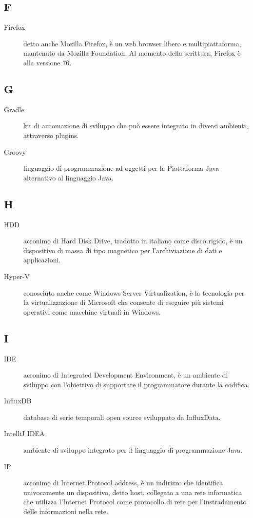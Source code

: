 \documentclass[../manuale-manutentore.tex]{subfiles}
\begin{document}
\subsection{F}

\begin{description}
  \item[Firefox] detto anche Mozilla Firefox, è un web browser libero e multipiattaforma, mantenuto da Mozilla Foundation. Al momento della scrittura, Firefox è alla versione 76.
\end{description}

\subsection{G}

\begin{description}
    \item[Gradle] kit di automazione di sviluppo che può essere integrato in diversi ambienti, attraverso plugins.
    \item[Groovy] linguaggio di programmazione ad oggetti per la Piattaforma Java alternativo al linguaggio Java.
\end{description}

\subsection{H}

\begin{description}
  \item[HDD] acronimo di Hard Disk Drive, tradotto in italiano come disco rigido, è un dispositivo di massa di tipo magnetico per l'archiviazione di dati e applicazioni.
  \item[Hyper-V] conosciuto anche come Windows Server Virtualization, è la tecnologia per la virtualizzazione di Microsoft che consente di eseguire più sistemi operativi come macchine virtuali in Windows.
\end{description}

\subsection{I}

\begin{description}
    \item[IDE] acronimo di Integrated Development Environment, è un ambiente di sviluppo con l'obiettivo di supportare il programmatore durante la codifica.
    \item[InfluxDB] database di serie temporali open source sviluppato da InfluxData.
    \item[IntelliJ IDEA] ambiente di sviluppo integrato per il linguaggio di programmazione Java.
    \item[IP] acronimo di Internet Protocol address, è un indirizzo che identifica univocamente un dispositivo, detto host, collegato a una rete informatica che utilizza l'Internet Protocol come protocollo di rete per l'instradamento delle informazioni nella rete.
\end{description}
\end{document}
